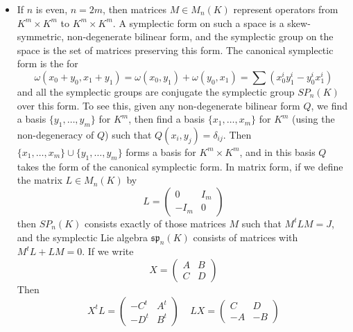 \begin{example}
\begin{itemize}
        \item If $n$ is even, $n = 2m$, then matrices $M \in M_n(K)$ represent operators from $K^m \times K^m$ to $K^m \times K^m$. A symplectic form on such a space is a skew-symmetric, non-degenerate bilinear form, and the symplectic group on the space is the set of matrices preserving this form. The canonical symplectic form is the for
        \[ \omega(x_0 + y_0, x_1 + y_1) = \omega(x_0,y_1) + \omega(y_0,x_1) = \sum (x_0^i y_1^i - y_0^i x_1^i) \]
        and all the symplectic groups are conjugate the symplectic group $SP_n(K)$ over this form. To see this, given any non-degenerate bilinear form $Q$, we find a basis $\{ y_1, \dots, y_m \}$ for $K^m$, then find a basis $\{ x_1, \dots, x_m \}$ for $K^m$ (using the non-degeneracy of $Q$) such that $Q(x_i,y_j) = \delta_{ij}$. Then $\{ x_1, \dots, x_m \} \cup \{ y_1, \dots, y_m \}$ forms a basis for $K^m \times K^m$, and in this basis $Q$ takes the form of the canonical symplectic form. In matrix form, if we define the matrix $L \in M_n(K)$ by
        \[ L = \begin{pmatrix} 0 & I_m \\ -I_m & 0 \end{pmatrix} \]
        then $SP_n(K)$ consists exactly of those matrices $M$ such that $M^tLM = J$, and the symplectic Lie algebra $\mathfrak{sp}_n(K)$ consists of matrices with $M^tL + LM = 0$. If we write
        \[ X = \begin{pmatrix} A & B \\ C & D \end{pmatrix} \]
        Then
        \[ X^tL = \begin{pmatrix} -C^t & A^t \\ -D^t & B^t \end{pmatrix}\ \ \ \ \ LX = \begin{pmatrix} C & D \\ -A & -B \end{pmatrix} \]

\end{itemize}
\end{example}
